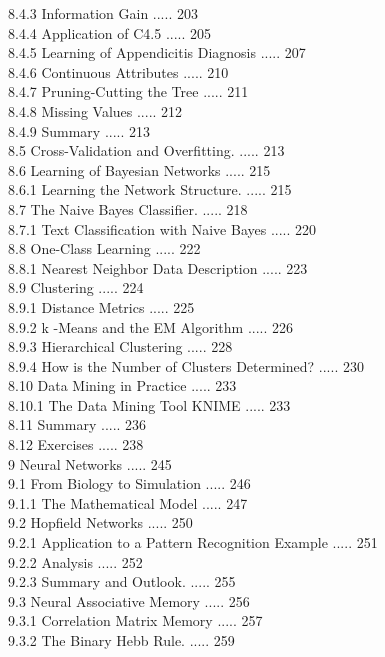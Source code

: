 \documentclass[10pt]{book}
\begin{document}
8.4.3 Information Gain ..... 203\\
8.4.4 Application of C4.5 ..... 205\\
8.4.5 Learning of Appendicitis Diagnosis ..... 207\\
8.4.6 Continuous Attributes ..... 210\\
8.4.7 Pruning-Cutting the Tree ..... 211\\
8.4.8 Missing Values ..... 212\\
8.4.9 Summary ..... 213\\
8.5 Cross-Validation and Overfitting. ..... 213\\
8.6 Learning of Bayesian Networks ..... 215\\
8.6.1 Learning the Network Structure. ..... 215\\
8.7 The Naive Bayes Classifier. ..... 218\\
8.7.1 Text Classification with Naive Bayes ..... 220\\
8.8 One-Class Learning ..... 222\\
8.8.1 Nearest Neighbor Data Description ..... 223\\
8.9 Clustering ..... 224\\
8.9.1 Distance Metrics ..... 225\\
8.9.2 k -Means and the EM Algorithm ..... 226\\
8.9.3 Hierarchical Clustering ..... 228\\
8.9.4 How is the Number of Clusters Determined? ..... 230\\
8.10 Data Mining in Practice ..... 233\\
8.10.1 The Data Mining Tool KNIME ..... 233\\
8.11 Summary ..... 236\\
8.12 Exercises ..... 238\\
9 Neural Networks ..... 245\\
9.1 From Biology to Simulation ..... 246\\
9.1.1 The Mathematical Model ..... 247\\
9.2 Hopfield Networks ..... 250\\
9.2.1 Application to a Pattern Recognition Example ..... 251\\
9.2.2 Analysis ..... 252\\
9.2.3 Summary and Outlook. ..... 255\\
9.3 Neural Associative Memory ..... 256\\
9.3.1 Correlation Matrix Memory ..... 257\\
9.3.2 The Binary Hebb Rule. ..... 259\\
\end{document}
